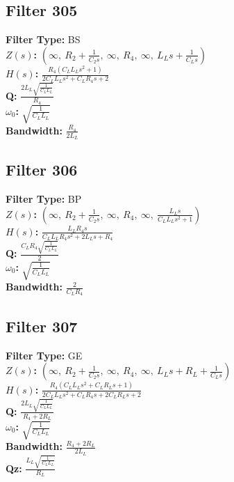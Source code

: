 \documentclass{article}
\begin{document}
\subsection*{Filter 305}
\textbf{Filter Type:} BS \\ 
\textbf{$Z(s)$:} $\left( \infty, \  R_{2} + \frac{1}{C_{2} s}, \  \infty, \  R_{4}, \  \infty, \  L_{L} s + \frac{1}{C_{L} s}\right)$ \\ 
\textbf{$H(s)$:} $\frac{R_{4} \left(C_{L} L_{L} s^{2} + 1\right)}{2 C_{L} L_{L} s^{2} + C_{L} R_{4} s + 2}$ \\ 
\textbf{Q:} $\frac{2 L_{L} \sqrt{\frac{1}{C_{L} L_{L}}}}{R_{4}}$ \\ 
\textbf{$\omega_0$:} $\sqrt{\frac{1}{C_{L} L_{L}}}$ \\ 
\textbf{Bandwidth:} $\frac{R_{4}}{2 L_{L}}$ \\ 
\subsection*{Filter 306}
\textbf{Filter Type:} BP \\ 
\textbf{$Z(s)$:} $\left( \infty, \  R_{2} + \frac{1}{C_{2} s}, \  \infty, \  R_{4}, \  \infty, \  \frac{L_{L} s}{C_{L} L_{L} s^{2} + 1}\right)$ \\ 
\textbf{$H(s)$:} $\frac{L_{L} R_{4} s}{C_{L} L_{L} R_{4} s^{2} + 2 L_{L} s + R_{4}}$ \\ 
\textbf{Q:} $\frac{C_{L} R_{4} \sqrt{\frac{1}{C_{L} L_{L}}}}{2}$ \\ 
\textbf{$\omega_0$:} $\sqrt{\frac{1}{C_{L} L_{L}}}$ \\ 
\textbf{Bandwidth:} $\frac{2}{C_{L} R_{4}}$ \\ 
\subsection*{Filter 307}
\textbf{Filter Type:} GE \\ 
\textbf{$Z(s)$:} $\left( \infty, \  R_{2} + \frac{1}{C_{2} s}, \  \infty, \  R_{4}, \  \infty, \  L_{L} s + R_{L} + \frac{1}{C_{L} s}\right)$ \\ 
\textbf{$H(s)$:} $\frac{R_{4} \left(C_{L} L_{L} s^{2} + C_{L} R_{L} s + 1\right)}{2 C_{L} L_{L} s^{2} + C_{L} R_{4} s + 2 C_{L} R_{L} s + 2}$ \\ 
\textbf{Q:} $\frac{2 L_{L} \sqrt{\frac{1}{C_{L} L_{L}}}}{R_{4} + 2 R_{L}}$ \\ 
\textbf{$\omega_0$:} $\sqrt{\frac{1}{C_{L} L_{L}}}$ \\ 
\textbf{Bandwidth:} $\frac{R_{4} + 2 R_{L}}{2 L_{L}}$ \\ 
\textbf{Qz:} $\frac{L_{L} \sqrt{\frac{1}{C_{L} L_{L}}}}{R_{L}}$ \\ 
\end{document}

